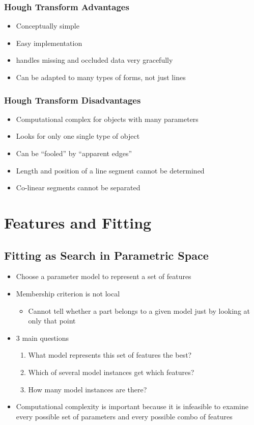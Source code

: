 \documentclass[letterpaper,12pt]{article}
\begin{document}
\subsubsection{Hough Transform Advantages}
\begin{itemize}
 \item Conceptually simple
 \item Easy implementation
 \item handles missing and occluded data very gracefully
 \item Can be adapted to many types of forms, not just lines
\end{itemize}

\subsubsection{Hough Transform Disadvantages}
\begin{itemize}
 \item Computational complex for objects with many parameters
 \item Looks for only one single type of object
 \item Can be ``fooled'' by ``apparent edges''
 \item Length and position of a line segment cannot be determined
 \item Co-linear segments cannot be separated
\end{itemize}

\section{Features and Fitting}
\subsection{Fitting as Search in Parametric Space}
\begin{itemize}
 \item Choose a parameter model to represent a set of features
 \item Membership criterion is not local
       \begin{itemize}
        \item Cannot tell whether a part belongs to a given model just by looking at only that point
       \end{itemize}
 \item 3 main questions
       \begin{enumerate}
        \item What model represents this set of features the best?
        \item Which of several model instances get which features?
        \item How many model instances are there?
       \end{enumerate}
 \item Computational complexity is important because it is infeasible to examine every possible set of parameters and every possible combo of features
\end{itemize}
\end{document}
